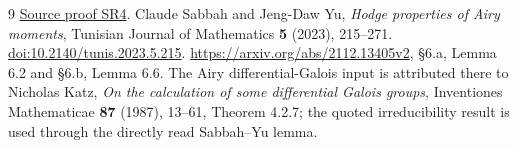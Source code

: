 \documentclass[11pt]{article}
\begin{document}
\begin{thebibliography}{9}
\href{https://github.com/KokunoYumeto/zeta-function-research-reader/blob/487253b5b01851da5b9b98af4e146fecf1fab902/workbenches/splitzero-tandem/continuations/20260919-arithmetic-signs-marked-classes/arrival_02/signed_refinement/SLOW_TAIL_AND_NONLINEAR_RECEIVER.tex\#L68}{Source proof SR4}.
Claude Sabbah and Jeng-Daw Yu, \emph{Hodge properties of Airy moments},
Tunisian Journal of Mathematics \textbf{5} (2023), 215--271.
\href{https://doi.org/10.2140/tunis.2023.5.215}{doi:10.2140/tunis.2023.5.215}.
\url{https://arxiv.org/abs/2112.13405v2}, \S6.a, Lemma 6.2 and
\S6.b, Lemma 6.6. The Airy differential-Galois input is attributed
there to Nicholas Katz, \emph{On the calculation of some differential
Galois groups}, Inventiones Mathematicae \textbf{87} (1987), 13--61,
Theorem 4.2.7; the quoted irreducibility result is used through the
directly read Sabbah--Yu lemma.
\end{thebibliography}
\end{document}
